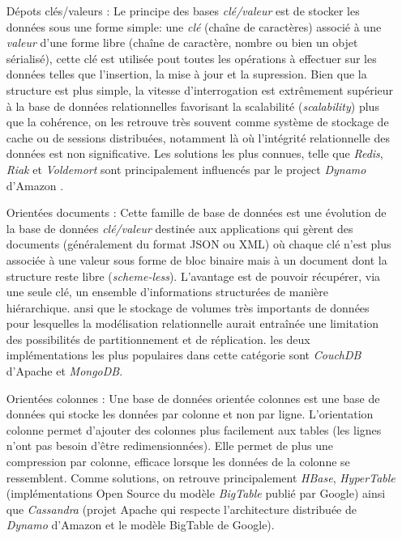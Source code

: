   \begin{itemize}
  \item [Dépots clés/valeurs]: Le principe des bases
    \textit{clé/valeur} est de stocker les données sous une forme
    simple: une \emph{clé } (chaîne de caractères) associé à une
    \emph{valeur} d'une forme libre (chaîne de caractère, nombre ou
    bien un objet sérialisé), cette clé est utilisée pout toutes les
    opérations à effectuer sur les données telles que l'insertion, la
    mise à jour et la supression. Bien que la structure est plus
    simple, la vitesse d'interrogation est extrêmement supérieur à la
    base de données relationnelles favorisant la scalabilité
    (\emph{scalability}) plus que la cohérence, on les retrouve très
    souvent comme système de stockage de cache ou de sessions
    distribuées, notamment là où l’intégrité relationnelle des données
    est non significative. Les solutions les plus connues, telle que
    \emph{Redis}, \emph{Riak} et \emph{Voldemort} sont principalement
    influencés par le project \emph{Dynamo} d'Amazon
    \cite{decandia2007dynamo}.
    \newpage

  \item [Orientées documents]: Cette famille de base de données est
    une évolution de la base de données \textit{clé/valeur} destinée
    aux applications qui gèrent des documents (généralement du format
    \textsc{JSON} ou \textsc{XML}) où chaque clé n'est plus associée à
    une valeur sous forme de bloc binaire mais à un document dont la
    structure reste libre (\textit{scheme-less}). L'avantage est de
    pouvoir récupérer, via une seule clé, un ensemble d’informations
    structurées de manière hiérarchique. ansi que le stockage de
    volumes très importants de données pour lesquelles la modélisation
    relationnelle aurait entraînée une limitation des possibilités de
    partitionnement et de réplication. les deux implémentations les
    plus populaires dans cette catégorie sont \emph{CouchDB} d'Apache
    et \emph{MongoDB}.

  \item [Orientées colonnes]: Une base de données orientée colonnes
    est une base de données qui stocke les données par colonne et non
    par ligne. L'orientation colonne permet d'ajouter des colonnes
    plus facilement aux tables (les lignes n'ont pas besoin d'être
    redimensionnées). Elle permet de plus une compression par colonne,
    efficace lorsque les données de la colonne se ressemblent. Comme
    solutions, on retrouve principalement \emph{HBase},
    \emph{HyperTable} (implémentations Open Source du modèle
    \emph{BigTable} \cite{chang2008bigtable} publié par Google) ainsi
    que \emph{Cassandra} (projet Apache qui respecte l'architecture
    distribuée de \emph{Dynamo} \cite{decandia2007dynamo} d'Amazon et
    le modèle BigTable de Google).


\end{itemize}
